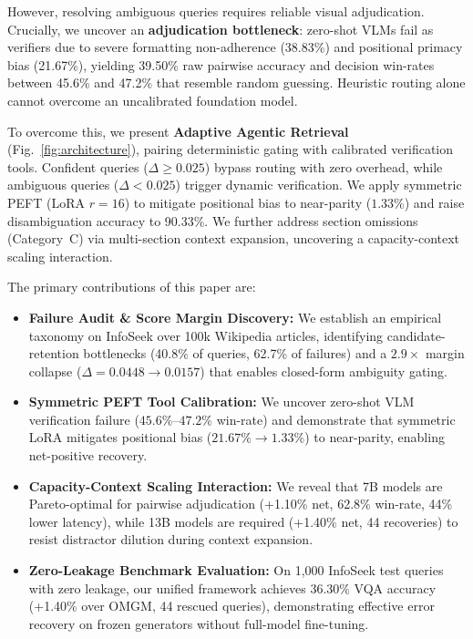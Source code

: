 \documentclass[conference]{IEEEtran}
\begin{document}
However, resolving ambiguous queries requires reliable visual adjudication. Crucially, we uncover an \textbf{adjudication bottleneck}: zero-shot VLMs fail as verifiers due to severe formatting non-adherence (38.83\%) and positional primacy bias (21.67\%), yielding 39.50\% raw pairwise accuracy and decision win-rates between 45.6\% and 47.2\% that resemble random guessing. Heuristic routing alone cannot overcome an uncalibrated foundation model.

To overcome this, we present \textbf{Adaptive Agentic Retrieval} (Fig.~\ref{fig:architecture}), pairing deterministic gating with calibrated verification tools. Confident queries ($\Delta \ge 0.025$) bypass routing with zero overhead, while ambiguous queries ($\Delta < 0.025$) trigger dynamic verification. We apply symmetric PEFT (LoRA $r=16$) to mitigate positional bias to near-parity ($1.33\%$) and raise disambiguation accuracy to 90.33\%. We further address section omissions (Category~C) via multi-section context expansion, uncovering a capacity-context scaling interaction.

The primary contributions of this paper are:
\begin{itemize}\setlength{\itemsep}{1pt plus 0.5pt}\setlength{\topsep}{1.5pt plus 0.5pt}\setlength{\parsep}{0pt}
    \item \textbf{Failure Audit \& Score Margin Discovery:} We establish an empirical taxonomy on InfoSeek over 100k Wikipedia articles, identifying candidate-retention bottlenecks (40.8\% of queries, 62.7\% of failures) and a $2.9\times$ margin collapse ($\Delta = 0.0448 \to 0.0157$) that enables closed-form ambiguity gating.
    \item \textbf{Symmetric PEFT Tool Calibration:} We uncover zero-shot VLM verification failure ($45.6\%$--$47.2\%$ win-rate) and demonstrate that symmetric LoRA mitigates positional bias ($21.67\% \to 1.33\%$) to near-parity, enabling net-positive recovery.
    \item \textbf{Capacity-Context Scaling Interaction:} We reveal that 7B models are Pareto-optimal for pairwise adjudication (+1.10\% net, 62.8\% win-rate, 44\% lower latency), while 13B models are required (+1.40\% net, 44 recoveries) to resist distractor dilution during context expansion.
    \item \textbf{Zero-Leakage Benchmark Evaluation:} On 1,000 InfoSeek test queries with zero leakage, our unified framework achieves 36.30\% VQA accuracy (+1.40\% over OMGM, 44 rescued queries), demonstrating effective error recovery on frozen generators without full-model fine-tuning.
\end{itemize}
\end{document}
